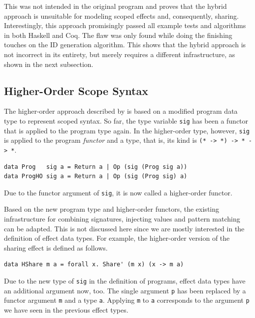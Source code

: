 \documentclass[a4paper, 11pt, fleqn, twoside, abstract=on]{scrreprt}
\newcommand{\hinl}[1]{\texttt{#1}}
\begin{document}
This was not intended in the original program and proves that the hybrid approach is unsuitable for modeling scoped effects and, consequently, sharing.
Interestingly, this approach promisingly passed all example tests and algorithms in both Haskell and Coq.
The flaw was only found while doing the finishing touches on the ID generation algorithm.
This shows that the hybrid approach is not incorrect in its entirety, but merely requires a different infrastructure, as shown in the next subsection.

\subsection{Higher-Order Scope Syntax}
\label{subsec:HOscopesyntax}
The higher-order approach described by \citet{wu2014effect} is based on a modified  program data type to represent scoped syntax.
So far, the type variable \hinl{sig} has been a functor that is applied to the program type again.
In the higher-order type, however, \hinl{sig} is applied to the program \textit{functor} and a type, that is, its kind is \hinl{(* -> *) -> * -> *}.

\begin{verbatim}
data Prog   sig a = Return a | Op (sig (Prog sig a))
data ProgHO sig a = Return a | Op (sig (Prog sig) a)
\end{verbatim}
\noindent
Due to the functor argument of \hinl{sig}, it is now called a higher-order functor.

Based on the new program type and higher-order functors, the existing infrastructure for combining signatures, injecting values and pattern matching can be adapted.
This is not discussed here since we are mostly interested in the definition of effect data types.
For example, the higher-order version of the sharing effect is defined as follows.

\begin{verbatim}
data HShare m a = forall x. Share' (m x) (x -> m a)
\end{verbatim}

Due to the new type of \hinl{sig} in the definition of programs, effect data types have an additional argument now, too.
The single argument \hinl{p} has been replaced by a functor argument \hinl{m} and a type \hinl{a}.
Applying \hinl{m} to \hinl{a} corresponds to the argument \hinl{p} we have seen in the previous effect types.
\end{document}
